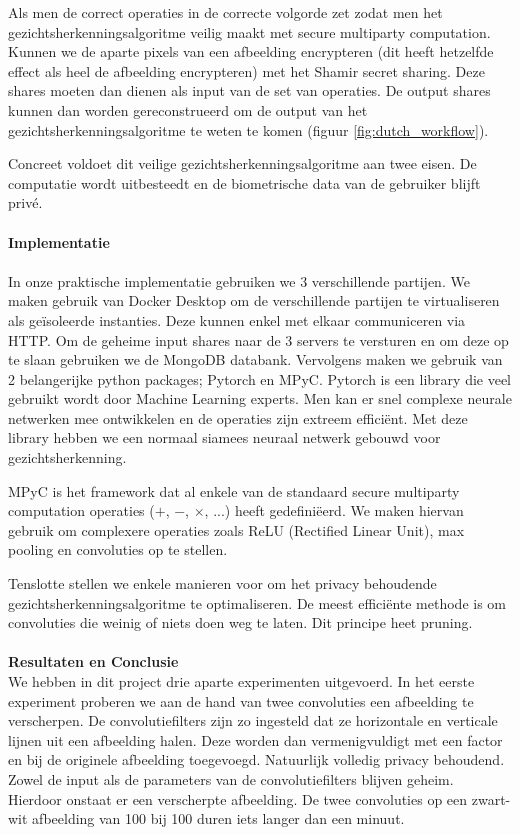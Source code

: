 Als men de correct operaties in de correcte volgorde zet zodat men het gezichtsherkenningsalgoritme veilig maakt met secure multiparty computation. Kunnen we de aparte pixels van een afbeelding encrypteren (dit heeft hetzelfde effect als heel de afbeelding encrypteren) met het Shamir secret sharing. Deze shares moeten dan dienen als input van de set van operaties. De output shares kunnen dan worden gereconstrueerd om de output van het gezichtsherkenningsalgoritme te weten te komen (figuur \ref{fig:dutch_workflow}).

Concreet voldoet dit veilige gezichtsherkenningsalgoritme aan twee eisen. De computatie wordt uitbesteedt en de biometrische data van de gebruiker blijft priv\'e.\\\\

\textbf{\Large{Implementatie}}\\\\
In onze praktische implementatie gebruiken we 3 verschillende partijen. We maken gebruik van Docker Desktop om de verschillende partijen te virtualiseren als ge\"isoleerde instanties. Deze kunnen enkel met elkaar communiceren via HTTP. Om de geheime input shares naar de 3 servers te versturen en om deze op te slaan gebruiken we de MongoDB databank. Vervolgens maken we gebruik van 2 belangerijke python packages; Pytorch en MPyC. Pytorch is een library die veel gebruikt wordt door Machine Learning experts. Men kan er snel complexe neurale netwerken mee ontwikkelen en de operaties zijn extreem effici\"ent. Met deze library hebben we een normaal siamees neuraal netwerk gebouwd voor gezichtsherkenning.

MPyC is het framework dat al enkele van de standaard secure multiparty computation operaties ($+$, $-$, $\times$, ...) heeft gedefini\"eerd. We maken hiervan gebruik om complexere operaties zoals ReLU (Rectified Linear Unit), max pooling en convoluties op te stellen.

Tenslotte stellen we enkele manieren voor om het privacy behoudende gezichtsherkenningsalgoritme te optimaliseren. De meest effici\"ente methode is om convoluties die weinig of niets doen weg te laten. Dit principe heet pruning.\\\\

\textbf{\Large{Resultaten en Conclusie}}\\
We hebben in dit project drie aparte experimenten uitgevoerd. In het eerste experiment proberen we aan de hand van twee convoluties een afbeelding te verscherpen. De convolutiefilters zijn zo ingesteld dat ze horizontale en verticale lijnen uit een afbeelding halen. Deze worden dan vermenigvuldigt met een factor en bij de originele afbeelding toegevoegd. Natuurlijk volledig privacy behoudend. Zowel de input als de parameters van de convolutiefilters blijven geheim. Hierdoor onstaat er een verscherpte afbeelding. De twee convoluties op een zwart-wit afbeelding van 100 bij 100 duren iets langer dan een minuut.

